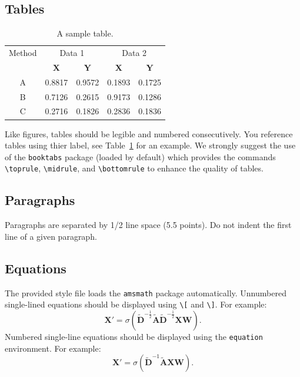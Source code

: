 \documentclass{article}
\begin{document}
\subsection{Tables}
\begin{table}
	\centering
	\caption{A sample table.}
	\label{tab:sample}
	\begin{tabular}{ccccc}
		\toprule
		\multirow{2.5}{*}{Method} & \multicolumn{2}{c}{Data 1} & \multicolumn{2}{c}{Data 2}  \\
		\cmidrule(lr){2-3} \cmidrule(lr){4-5}
		& \(\mathbf{X}\) & \(\mathbf{Y}\) & \(\mathbf{X}\) & \(\mathbf{Y}\) \\
		\midrule
		A & 0.8817  & 0.9572 & 0.1893 & 0.1725 \\
		B & 0.7126  & 0.2615 & 0.9173 & 0.1286 \\
		C & 0.2716  & 0.1826 & 0.2836 & 0.1836 \\
		\bottomrule
	\end{tabular}
\end{table}

Like figures, tables should be legible and numbered consecutively.
You reference tables using thier label, see Table~\ref{tab:sample} for an example.
We strongly suggest the use of the \texttt{booktabs} package (loaded by default) which provides the commands \verb+\toprule+, \verb+\midrule+, and \verb+\bottomrule+ to enhance the quality of tables.

\subsection{Paragraphs}
Paragraphs are separated by 1/2 line space (5.5 points).
Do not indent the first line of a given paragraph.

\subsection{Equations}
The provided style file loads the \verb+amsmath+ package automatically.
Unnumbered single-lined equations should be displayed using \verb+\[+ and \verb+\]+. For example:
\[
	\mathbf{X}' = \sigma(\widetilde{\mathbf{D}}^{-\frac{1}{2}}\widetilde{\mathbf{A}}\widetilde{\mathbf{D}}^{-\frac{1}{2}} \mathbf{XW}).
\]
Numbered single-line equations should be displayed using the \verb+equation+ environment. For example:
\begin{equation}
	\mathbf{X}' = \sigma(\widetilde{\mathbf{D}}^{-1}\widetilde{\mathbf{A}}\mathbf{XW}).
\end{equation}
\end{document}
